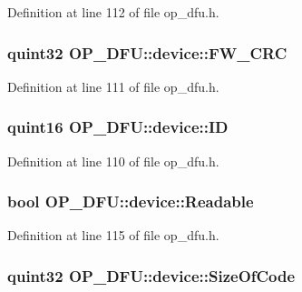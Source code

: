 \-Definition at line 112 of file op\-\_\-dfu.\-h.

\hypertarget{struct_o_p___d_f_u_1_1device_a9f0dfb2fe44c04290c45c907ef33b21d}{
\subsubsection[{\-F\-W\-\_\-\-C\-R\-C}]{\setlength{\rightskip}{0pt plus 5cm}quint32 {\bf \-O\-P\-\_\-\-D\-F\-U\-::device\-::\-F\-W\-\_\-\-C\-R\-C}}}\label{struct_o_p___d_f_u_1_1device_a9f0dfb2fe44c04290c45c907ef33b21d}


\-Definition at line 111 of file op\-\_\-dfu.\-h.

\hypertarget{struct_o_p___d_f_u_1_1device_afb3f2517289d989e75630f33abbc4685}{
\subsubsection[{\-I\-D}]{\setlength{\rightskip}{0pt plus 5cm}quint16 {\bf \-O\-P\-\_\-\-D\-F\-U\-::device\-::\-I\-D}}}\label{struct_o_p___d_f_u_1_1device_afb3f2517289d989e75630f33abbc4685}


\-Definition at line 110 of file op\-\_\-dfu.\-h.

\hypertarget{struct_o_p___d_f_u_1_1device_a0640f3f5608690d8bb93087ba8c15e86}{
\subsubsection[{\-Readable}]{\setlength{\rightskip}{0pt plus 5cm}bool {\bf \-O\-P\-\_\-\-D\-F\-U\-::device\-::\-Readable}}}\label{struct_o_p___d_f_u_1_1device_a0640f3f5608690d8bb93087ba8c15e86}


\-Definition at line 115 of file op\-\_\-dfu.\-h.

\hypertarget{struct_o_p___d_f_u_1_1device_a02ce2352ca3f52e77ef7073f1fd0afeb}{
\subsubsection[{\-Size\-Of\-Code}]{\setlength{\rightskip}{0pt plus 5cm}quint32 {\bf \-O\-P\-\_\-\-D\-F\-U\-::device\-::\-Size\-Of\-Code}}}\label{struct_o_p___d_f_u_1_1device_a02ce2352ca3f52e77ef7073f1fd0afeb}


